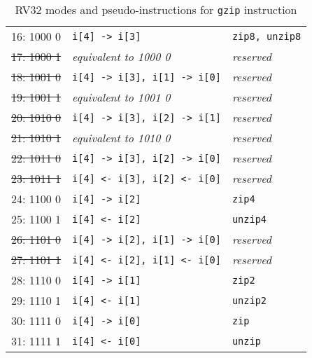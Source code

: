 \begin{table}[h]
\begin{small}
\begin{center}
\begin{tabular}{r l l}
\hline

      16: 1000 0  & {\tt i[4] -> i[3]}               & {\tt zip8, unzip8}     \\
\sout{17: 1000 1} & {\it equivalent to 1000 0}       & {\it reserved}         \\
\sout{18: 1001 0} & {\tt i[4] -> i[3], i[1] -> i[0]} & {\it reserved}         \\
\sout{19: 1001 1} & {\it equivalent to 1001 0}       & {\it reserved}         \\
\sout{20: 1010 0} & {\tt i[4] -> i[3], i[2] -> i[1]} & {\it reserved}         \\
\sout{21: 1010 1} & {\it equivalent to 1010 0}       & {\it reserved}         \\
\sout{22: 1011 0} & {\tt i[4] -> i[3], i[2] -> i[0]} & {\it reserved}         \\
\sout{23: 1011 1} & {\tt i[4] <- i[3], i[2] <- i[0]} & {\it reserved}         \\

\hline

      24: 1100 0  & {\tt i[4] -> i[2]}               & {\tt zip4}             \\
      25: 1100 1  & {\tt i[4] <- i[2]}               & {\tt unzip4}           \\
\sout{26: 1101 0} & {\tt i[4] -> i[2], i[1] -> i[0]} & {\it reserved}         \\
\sout{27: 1101 1} & {\tt i[4] <- i[2], i[1] <- i[0]} & {\it reserved}         \\
      28: 1110 0  & {\tt i[4] -> i[1]}               & {\tt zip2}             \\
      29: 1110 1  & {\tt i[4] <- i[1]}               & {\tt unzip2}           \\
      30: 1111 0  & {\tt i[4] -> i[0]}               & {\tt zip}              \\
      31: 1111 1  & {\tt i[4] <- i[0]}               & {\tt unzip}            \\
\end{tabular}
\end{center}
\end{small}
\caption{RV32 modes and pseudo-instructions for {\tt gzip} instruction}
\label{gzip32-modes}
\end{table}

